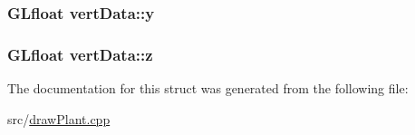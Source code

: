 \label{structvertData_a9f2687edf1fb3cf42ab1631b4d2fb088}
\hypertarget{structvertData_aa95cc4d9dc894a522dff1bbf8cbf6824}{
\subsubsection[{y}]{\setlength{\rightskip}{0pt plus 5cm}GLfloat {\bf vertData::y}}}
\label{structvertData_aa95cc4d9dc894a522dff1bbf8cbf6824}
\hypertarget{structvertData_a1e486c5488cdc3bb79302cb8c088a665}{
\subsubsection[{z}]{\setlength{\rightskip}{0pt plus 5cm}GLfloat {\bf vertData::z}}}
\label{structvertData_a1e486c5488cdc3bb79302cb8c088a665}


The documentation for this struct was generated from the following file:\begin{DoxyCompactItemize}
\item 
src/\hyperlink{drawPlant_8cpp}{drawPlant.cpp}\end{DoxyCompactItemize}
